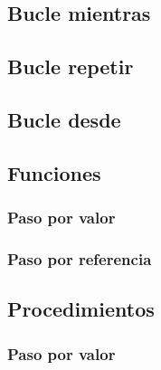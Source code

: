 \documentclass{article}
\begin{document}
\begin{appendices}
  

  \subsection{Bucle mientras}

  

  \subsection{Bucle repetir}

  

  \subsection{Bucle desde}

  

  \subsection{Funciones}
    
  \subsubsection{Paso por valor}

  

  \subsubsection{Paso por referencia}
  

  \subsection{Procedimientos}
  \subsubsection{Paso por valor}
  


\end{appendices}
\end{document}
